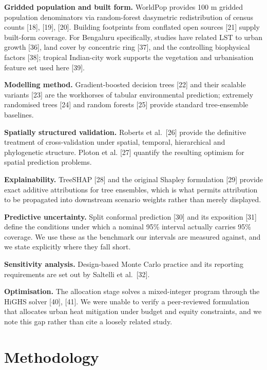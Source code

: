 \documentclass[conference]{IEEEtran}
\begin{document}
\textbf{Gridded population and built form.} WorldPop provides 100 m gridded population denominators via
random-forest dasymetric redistribution of census counts {[}18{]}, {[}19{]}, {[}20{]}. Building footprints from
conflated open sources {[}21{]} supply built-form coverage. For Bengaluru specifically, studies have
related LST to urban growth {[}36{]}, land cover by concentric ring {[}37{]}, and the controlling
biophysical factors {[}38{]}; tropical Indian-city work supports the vegetation and urbanisation feature
set used here {[}39{]}.

\textbf{Modelling method.} Gradient-boosted decision trees {[}22{]} and their scalable variants {[}23{]} are the
workhorses of tabular environmental prediction; extremely randomised trees {[}24{]} and random forests
{[}25{]} provide standard tree-ensemble baselines.

\textbf{Spatially structured validation.} Roberts et al.~{[}26{]} provide the definitive treatment of
cross-validation under spatial, temporal, hierarchical and phylogenetic structure. Ploton et al.
{[}27{]} quantify the resulting optimism for spatial prediction problems.

\textbf{Explainability.} TreeSHAP {[}28{]} and the original Shapley formulation {[}29{]} provide exact additive
attributions for tree ensembles, which is what permits attribution to be propagated into downstream
scenario weights rather than merely displayed.

\textbf{Predictive uncertainty.} Split conformal prediction {[}30{]} and its exposition {[}31{]} define the
conditions under which a nominal 95\% interval actually carries 95\% coverage. We use these as the
benchmark our intervals are measured against, and we state explicitly where they fall short.

\textbf{Sensitivity analysis.} Design-based Monte Carlo practice and its reporting requirements are set
out by Saltelli et al.~{[}32{]}.

\textbf{Optimisation.} The allocation stage solves a mixed-integer program through the HiGHS solver
{[}40{]}, {[}41{]}. We were unable to verify a peer-reviewed formulation that allocates urban heat
mitigation under budget and equity constraints, and we note this gap rather than cite a loosely
related study.

\section{Methodology}\label{iii.-methodology}
\end{document}
